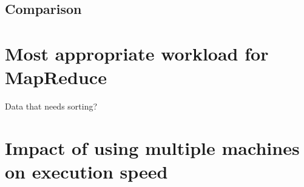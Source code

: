 \documentclass[12pt, letterpaper]{article}
\begin{document}
\subsection{Comparison}
	
\section{Most appropriate workload for MapReduce}
	Data that needs sorting?
\section{Impact of using multiple machines on execution speed}
	
\end{document}
